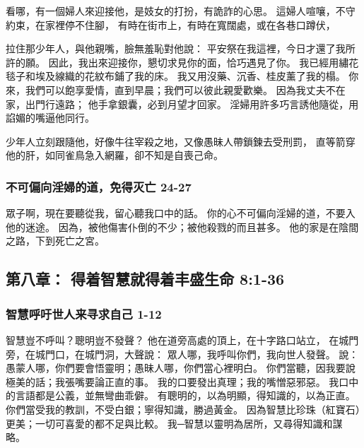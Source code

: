 看哪，有一個婦人來迎接他，是妓女的打扮，有詭詐的心思。
這婦人喧嚷，不守約束，在家裡停不住腳，
有時在街市上，有時在寬闊處，或在各巷口蹲伏，

拉住那少年人，與他親嘴，臉無羞恥對他說：
平安祭在我這裡，今日才還了我所許的願。
因此，我出來迎接你，懇切求見你的面，恰巧遇見了你。
我已經用繡花毯子和埃及線織的花紋布鋪了我的床。
我又用沒藥、沉香、桂皮薰了我的榻。
你來，我們可以飽享愛情，直到早晨；我們可以彼此親愛歡樂。
因為我丈夫不在家，出門行遠路；
他手拿銀囊，必到月望才回家。
淫婦用許多巧言誘他隨從，用諂媚的嘴逼他同行。

少年人立刻跟隨他，好像牛往宰殺之地，又像愚昧人帶鎖鍊去受刑罰，
直等箭穿他的肝，如同雀鳥急入網羅，卻不知是自喪己命。


\subsubsection{不可偏向淫婦的道，免得灭亡 24-27}
眾子啊，現在要聽從我，留心聽我口中的話。
你的心不可偏向淫婦的道，不要入他的迷途。
因為，被他傷害仆倒的不少；被他殺戮的而且甚多。
他的家是在陰間之路，下到死亡之宮。










\subsection{第八章： 得着智慧就得着丰盛生命  8:1-36}
\subsubsection{智慧呼吁世人来寻求自己 1-12}
智慧豈不呼叫？聰明豈不發聲？
他在道旁高處的頂上，在十字路口站立，
在城門旁，在城門口，在城門洞，大聲說：
眾人哪，我呼叫你們，我向世人發聲。
說：愚蒙人哪，你們要會悟靈明；愚昧人哪，你們當心裡明白。
你們當聽，因我要說極美的話；我張嘴要論正直的事。
我的口要發出真理；我的嘴憎惡邪惡。
我口中的言語都是公義，並無彎曲乖僻。
有聰明的，以為明顯，得知識的，以為正直。
你們當受我的教訓，不受白銀；寧得知識，勝過黃金。
因為智慧比珍珠（紅寶石）更美；一切可喜愛的都不足與比較。
我─智慧以靈明為居所，又尋得知識和謀略。

